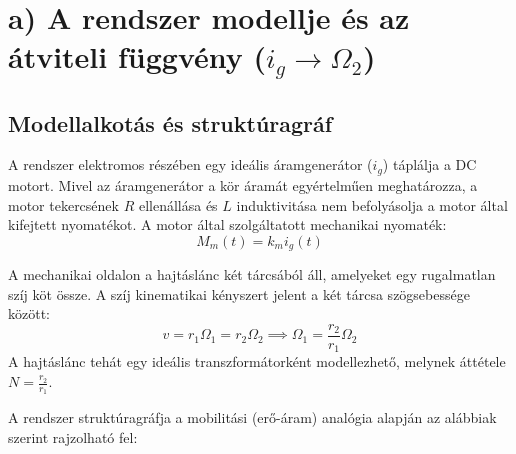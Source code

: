 \section{a) A rendszer modellje és az átviteli függvény ($i_g \to \Omega_2$)}

\subsection{Modellalkotás és struktúragráf}
A rendszer elektromos részében egy ideális áramgenerátor ($i_g$) táplálja a DC motort. Mivel az áramgenerátor a kör áramát egyértelműen meghatározza, a motor tekercsének $R$ ellenállása és $L$ induktivitása nem befolyásolja a motor által kifejtett nyomatékot. A motor által szolgáltatott mechanikai nyomaték:
\begin{equation}
	M_m(t) = k_m i_g(t)
\end{equation}

A mechanikai oldalon a hajtáslánc két tárcsából áll, amelyeket egy rugalmatlan szíj köt össze. A szíj kinematikai kényszert jelent a két tárcsa szögsebessége között:
\begin{equation}
	v = r_1 \Omega_1 = r_2 \Omega_2 \implies \Omega_1 = \frac{r_2}{r_1} \Omega_2
\end{equation}
A hajtáslánc tehát egy ideális transzformátorként modellezhető, melynek áttétele $N = \frac{r_2}{r_1}$.

A rendszer struktúragráfja a mobilitási (erő-áram) analógia alapján az alábbiak szerint rajzolható fel:

